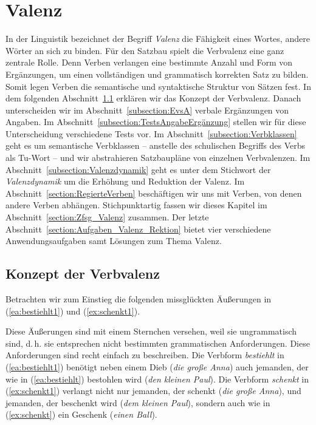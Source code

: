 \chapter{Valenz}\label{chapter:Valenz}

In der Linguistik bezeichnet der Begriff \textit{Valenz} die Fähigkeit eines Wortes, andere Wörter an sich zu binden. Für den Satzbau spielt die Verbvalenz eine ganz zentrale Rolle. Denn Verben verlangen eine bestimmte Anzahl und Form von Ergänzungen, um einen vollständigen und grammatisch korrekten Satz zu bilden. Somit legen Verben die semantische und syntaktische Struktur von Sätzen fest.
In dem folgenden Abschnitt~\ref{section:KonzeptVerbvalenz} erklären wir das Konzept der Verbvalenz. Danach unterscheiden wir im Abschnitt~\ref{subsection:EvsA} verbale Ergänzungen von Angaben. Im Abschnitt~\ref{subsection:TestsAngabeErgänzung} stellen wir für diese Unterscheidung verschiedene Tests vor. Im Abschnitt~\ref{subsection:Verbklassen} geht es um semantische Verbklassen -- anstelle des schulischen Begriffs des Verbs als Tu-Wort -- und wir abstrahieren Satzbaupläne von einzelnen Verbvalenzen. Im Abschnitt~\ref{subsection:Valenzdynamik} geht es unter dem Stichwort der \textit{Valenzdynamik} um die Erhöhung und Reduktion der Valenz. Im Abschnitt~\ref{section:RegierteVerben} beschäftigen wir uns mit Verben, von denen andere Verben abhängen. Stichpunktartig fassen wir dieses Kapitel im Abschnitt~\ref{section:Zfsg_Valenz} zusammen. Der letzte Abschnitt~\ref{section:Aufgaben_Valenz_Rektion} bietet vier verschiedene Anwendungsaufgaben samt Lösungen zum Thema Valenz. 

\section{Konzept der Verbvalenz} \label{section:KonzeptVerbvalenz}

Betrachten wir zum Einstieg die folgenden missglückten Äußerungen in (\ref{ea:bestiehlt1}) und (\ref{ex:schenkt1}). 

\ea 
{}\label{ea:bestiehlt1}
\label{ex:schenkt1}
\z 
\z 

Diese Äußerungen sind mit einem Sternchen versehen, weil sie ungrammatisch sind, d.\,h. sie entsprechen nicht bestimmten grammatischen Anforderungen. Diese Anforderungen sind recht einfach zu beschreiben. Die Verbform \textit{bestiehlt} in (\ref{ea:bestiehlt1}) benötigt neben einem Dieb (\textit{die große Anna}) auch jemanden, der wie in (\ref{ea:bestiehlt}) bestohlen wird (\textit{den kleinen Paul}). Die Verbform \textit{schenkt} in (\ref{ex:schenkt1}) verlangt nicht nur jemanden, der schenkt (\textit{die große Anna}), und jemanden, der beschenkt wird (\textit{dem kleinen Paul}), sondern auch wie in (\ref{ex:schenkt}) ein Geschenk (\textit{einen Ball}).  

